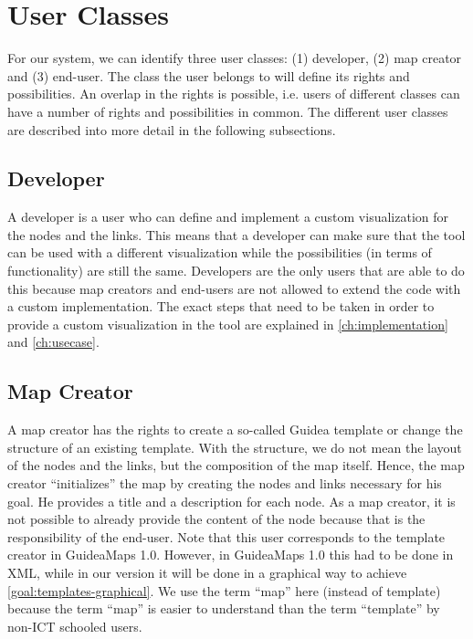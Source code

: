 \section{User Classes}\label{sec:user-classes}
For our system, we can identify three user classes: (1) developer, (2) map creator and (3) end-user. The class the user belongs to will define its rights and possibilities. An overlap in the rights is possible, i.e. users of different classes can have a number of rights and possibilities in common. The different user classes are described into more detail in the following subsections.

\subsection{Developer}\label{sec:user-class-developer}
A developer is a user who can define and implement a custom visualization for the nodes and the links. This means that a developer can make sure that the tool can be used with a different visualization while the possibilities (in terms of functionality) are still the same. Developers are the only users that are able to do this because map creators and end-users are not allowed to extend the code with a custom implementation. The exact steps that need to be taken in order to provide a custom visualization in the tool are explained in \autoref{ch:implementation} and \ref{ch:usecase}.

\subsection{Map Creator}\label{sec:user-class-map-creator}
A map creator has the rights to create a so-called Guidea template or change the structure of an existing template. With the structure, we do not mean the layout of the nodes and the links, but the composition of the map itself. Hence, the map creator ``initializes'' the map by creating the nodes and links necessary for his goal. He provides a title and a description for each node. As a map creator, it is not possible to already provide the content of the node because that is the responsibility of the end-user. Note that this user corresponds to the template creator in GuideaMaps 1.0. However, in GuideaMaps 1.0 this had to be done in XML, while in our version it will be done in a graphical way to achieve \ref{goal:templates-graphical}. We use the term ``map'' here (instead of template) because the term ``map'' is easier to understand than the term ``template'' by non-ICT schooled users.

